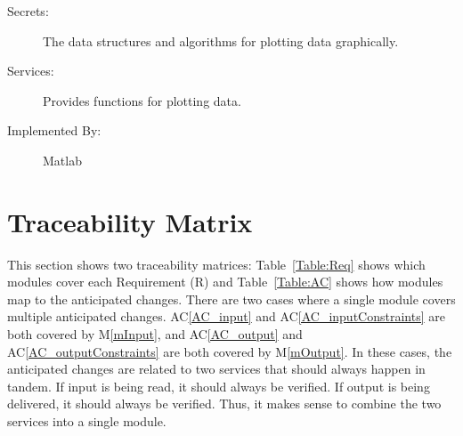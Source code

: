 \documentclass[12pt, titlepage]{article}
\newcommand{\acref}[1]{AC\ref{#1}}
\newcommand{\mref}[1]{M\ref{#1}}
\begin{document}
\begin{description}
\item[Secrets:] The data structures and algorithms for plotting data
  graphically.
\item[Services:] Provides functions for plotting data.
\item[Implemented By:] Matlab
\end{description}

\section{Traceability Matrix} \label{SecTM}

\hspace{3ex}This section shows two traceability matrices: Table~\ref{Table:Req} 
shows which modules cover each Requirement (R) and Table~\ref{Table:AC} shows 
how modules map to the anticipated changes. There are two cases where a single 
module covers multiple anticipated changes. \acref{AC_input} and 
\acref{AC_inputConstraints} are both covered by \mref{mInput}, and 
\acref{AC_output} and \acref{AC_outputConstraints} are both covered by 
\mref{mOutput}. In these cases, the anticipated changes are related to two 
services that should always happen in tandem. If input is being read, it should 
always be verified. If output is being delivered, it should always be verified. 
Thus, it makes sense to combine the two services into a single module.

\end{document}
